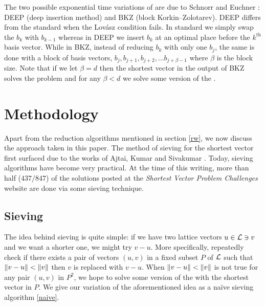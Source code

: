 \documentclass{homework}
\begin{document}
The two possible exponential time variations of \LLL{} are due to
Schnorr \cite{schnorr1987hierarchy} and Euchner
\cite{schnorr1994lattice}: DEEP (deep insertion method) and BKZ (block
Korkin--Zolotarev). DEEP differs from the standard \LLL{} when the
Lov\'asz condition fails. In standard \LLL{} we simply swap the $b_k$
with $b_{k-1}$ whereas in DEEP we insert $b_k$ at an optimal place
before the $k^\text{th}$ basis vector. While in BKZ, instead of
reducing $b_k$ with only one $b_{j}$, the same is done with a block of
basis vectors, $b_j, b_{j+1}, b_{j+2}, \dots b_{j+\beta - 1}$ where
$\beta$ is the block size. Note that if we let $\beta=d$ then the
shortest vector in the output of BKZ solves the \SVP{} problem and for
any $\beta < d$ we solve some version of the \appr\SVP{}.

\section{Methodology}

Apart from the reduction algorithms mentioned in section \ref{rw}, we
now discuss the approach taken in this paper. The method of sieving
for the shortest vector first surfaced due to the works of Ajtai,
Kumar and Sivakumar \cite{ajtai2001sieve}. Today, sieving algorithms
have become very practical. At the time of this writing, more than
half ($437/847$) of the solutions posted at the \textit{Shortest
  Vector Problem Challenges} website \cite{LatticeChallenge2025} are
done via some sieving technique.

\subsection{Sieving} The idea behind sieving is quite simple: if we
have two lattice vectors $u \in \mathcal{L} \ni v$ and we want a shorter one,
we might try $v - u$. More specifically, repeatedly check if there
exists a pair of vectors $(u, v)$ in a fixed subset $P$ of $\mathcal{L}$ such
that $\left\lVert v - u\right\rVert < \left\lVert v\right\rVert$ then $v$ is replaced with $v - u$. When
$\left\lVert v - u\right\rVert < \left\lVert v\right\rVert$ is not true for any pair $(u, v)$ in $P^2$,
we hope to solve some version of the \appr\SVP{} with the shortest
vector in $P$. We give our variation of the aforementioned idea as a
na\"ive sieving algorithm \ref{naive}.
\end{document}
